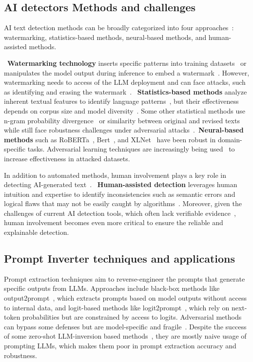 \subsection{AI detectors Methods and challenges}
AI text detection methods can be broadly categorized into four approaches~\cite{r12}: watermarking, statistics-based methods, neural-based methods, and human-assisted methods.

~\textbf{Watermarking technology} inserts specific patterns into training datasets~\cite{r27,r28} or manipulates the model output during inference to embed a watermark~\cite{r29}. However, watermarking needs to access of the LLM deployment and can face attacks, such as identifying and erasing the watermark~\cite{r30}. ~\textbf{Statistics-based methods} analyze inherent textual features to identify language patterns~\cite{r31,r32}, but their effectiveness depends on corpus size and model diversity~\cite{r12}. Some other statistical methods use n-gram probability divergence~\cite{r36} or similarity between original and revised texts~\cite{r37,r38} while still face robustness challenges under adversarial attacks~\cite{r12}.~\textbf{Neural-based methods} such as RoBERTa~\cite{r42}, Bert~\cite{r44}, and XLNet~\cite{r45} have been robust in domain-specific tasks. Adversarial learning techniques are increasingly being used~\cite{r46} to increase effectiveness in attacked datasets.

In addition to automated methods, human involvement plays a key role in detecting AI-generated text~\cite{r12}. ~\textbf{Human-assisted detection} leverages human intuition and expertise to identify inconsistencies such as semantic errors and logical flaws that may not be easily caught by algorithms~\cite{r49,r50}. Moreover, given the challenges of current AI detection tools, which often lack verifiable evidence~\cite{r22}, human involvement becomes even more critical to ensure the reliable and explainable detection.

\subsection{Prompt Inverter techniques and applications}
Prompt extraction techniques aim to reverse-engineer the prompts that generate specific outputs from LLMs. Approaches include black-box methods like output2prompt~\cite{r4}, which extracts prompts based on model outputs without access to internal data, and logit-based methods like logit2prompt~\cite{r51}, which rely on next-token probabilities but are constrained by access to logits. Adversarial methods can bypass some defenses but are model-specific and fragile~\cite{r52}. Despite the success of some zero-shot LLM-inversion based methods~\cite{r53, r62}, they are mostly naive usage of prompting LLMs, which makes them poor in prompt extraction accuracy and robustness.